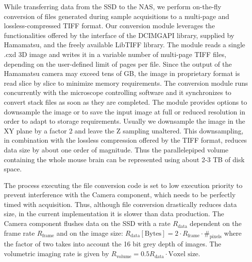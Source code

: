 \documentclass[12pt]{spieman}  %
\begin{document}

While transferring data from the SSD to the NAS, we perform on-the-fly conversion of files generated during sample acquisitions to a multi-page and lossless-compressed TIFF format. %
Our conversion module leverages the functionalities offered by the interface of the DCIMGAPI library, supplied by Hamamatsu, and the freely available LibTIFF library. The module reads a single .cxd 3D image and writes it in a variable number of multi-page TIFF files, depending on the user-defined limit of pages per file. Since the output of the Hamamatsu camera may exceed tens of GB, the image in proprietary format is read slice by slice to minimize memory requirements. The conversion module runs concurrently with the microscope controlling software and it synchronizes to convert stack files as soon as they are completed. The module provides options to downsample the image or to save the input image at full or reduced resolution in order to adapt to storage requirements. Usually we downsample the image in the XY plane by a factor 2 and leave the Z sampling unaltered. This downsampling, in combination with the lossless compression offered by the TIFF format, reduces data size by about one order of magnitude. Thus the parallelepiped volume containing the whole mouse brain can be represented using about 2-3 TB of disk space. 

The process executing the file conversion code is set to low execution priority to prevent interference with the Camera component, which needs to be perfectly timed with acquisition. Thus, although file conversion drastically reduces data size, in the current implementation it is slower than data production. The Camera component flushes data on the SSD with a rate $R_{\text{data}}$ dependent on the frame rate $R_{\text{frame}}$ and on the image size: $R_{\text{data}} [\text{Bytes}] = 2\cdot R_{\text{frame}} \cdot \#_{\text{pixels}}$
where the factor of two takes into account the 16 bit grey depth of images. The volumetric imaging rate is given by $R_{\text{volume}} = 0.5 R_{\text{data}} \cdot \text{Voxel size}$.
\end{document}
